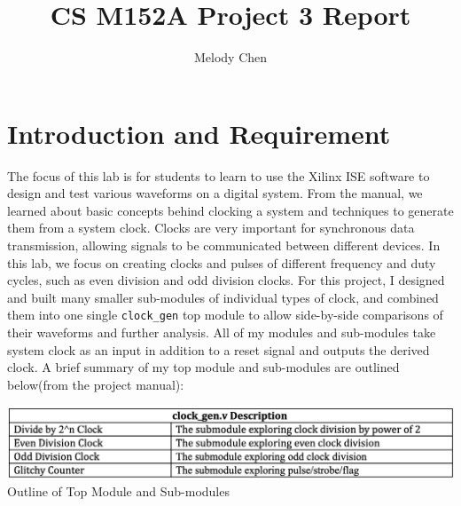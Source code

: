 \documentclass{article}
\title{\vspace{-2.0cm}CS M152A Project 3 Report}
\author{Melody Chen}
\begin{document}
\maketitle
\section{Introduction and Requirement} 
The focus of this lab is for students to learn to use the Xilinx ISE software to design and test various waveforms on a digital system. From the manual, we learned about basic concepts behind clocking a system and techniques to generate them from a system clock.  Clocks are very important for synchronous data transmission, allowing signals to be communicated between different devices. In this lab, we focus on creating clocks and pulses of different frequency and duty cycles, such as even division and odd division clocks. For this project, I designed and built many smaller sub-modules of individual types of clock, and combined them into one single \texttt{clock\_gen} top module to allow side-by-side comparisons of their waveforms and further analysis. All of my modules and sub-modules take system clock as an input in addition to a reset signal and outputs the derived clock. A brief summary of my top module and sub-modules are outlined below(from the project manual):
\begin{center}
    \includegraphics[scale=0.35]{intro.png} \\
    \caption{Outline of Top Module and Sub-modules}
\end{center}
\end{document}
